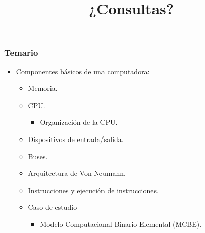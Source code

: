 \documentclass[11pt,a4paper,spanish]{beamer}
\begin{document}
\begin{frame}

    \frametitle{Temario}

\begin{itemize}

    \item Componentes básicos de una computadora:
    \begin{itemize}
        \item Memoria.
        \item CPU.
        \begin{itemize}
            \item Organización de la CPU.
        \end{itemize}
        \item Dispositivos de entrada/salida.
        \item Buses.
        \item Arquitectura de Von Neumann.
        \item Instrucciones y ejecución de instrucciones.
        \item Caso de estudio
            \begin{itemize}
                \item Modelo Computacional Binario Elemental (MCBE).
            \end{itemize}
    \end{itemize}

\end{itemize}
\end{frame}

\begin{frame}

\title{¿Consultas?}
\maketitle

\end{frame}

\setcounter{lastPage}{\number\value{page}}

\setcounter{page}{\number\value{lastPage}}
\end{document}
